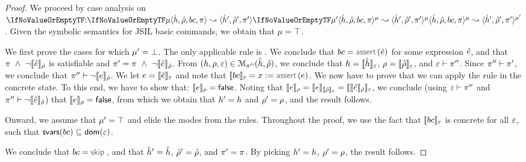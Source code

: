 \begin{proof}
We proceed by case analysis on $\symbtrans[][\mode][\mode']{\sheap, \sstore, \bcmd, \pc}{\sheap', \sstore', \pc'}$. 
Given the symbolic semantics for JSIL basic commands, we obtain that $\mode = \top$. 

\medskip
We first prove the cases for which $\mode' = \bot$. The only applicable rule is .
We conclude that  $\bcmd = \assert(\sexpr)$ for some expression $\sexpr$, and that
$\pc \ \wedge \  \neg\symbeval{\sexpr}{\sstore}$ is satisfiable and $\pc' = \pc \ \wedge \  \neg\symbeval{\sexpr}{\sstore}$. 
From $(\heap, \store, \senv) \in \smodels{\sheap, \sstore}{\pc''}$, we conclude that $\heap = \semexpr{\sheap}{\senv}$, $\store = \semexpr{\sstore}{\senv}$, and 
$\senv \vdash \pc''$. Since $\pc'' \vdash \pc'$,
we conclude that $\pc'' \vdash \neg\symbeval{\jsilexpr}{\sstore}$.
We let $\jsilexpr = \symbeval{\sexpr}{\senv}$ and note that $\symbeval{\bcmd}{\senv} = \jvar := \assert(\jsilexpr)$.
We now have to prove that we can apply the  rule in the concrete state.
To this end, we have to show that: $\symbeval{\jsilexpr}{\store} = \jfalse$. 
Noting that
$
  \symbeval{\jsilexpr}{\store} = \symbeval{\jsilexpr}{\symbeval{\sstore}{\senv}} 
         = \symbeval{\symbeval{\sexpr}{\sstore}}{\senv} 
$, we conclude (using $\senv \vdash \pc''$ and $\pc'' \vdash  \neg\symbeval{\sexpr}{\sstore}$) that 
$\symbeval{\jsilexpr}{\store} = \jfalse$, from which we obtain that $\heap' = \heap$ and $\store' = \store$, and the result follows. 

\medskip
Onward, we assume that $\mode' = \top$ and elide the modes from the rules.
Throughout the proof, we use the fact that $\symbeval{\bcmd}{\senv}$ is concrete for all $\senv$, such that $\svarsreallyqueen(\bcmd) \subseteq \domain(\senv)$.
\vspace{5pt}

\noindent{} 
We conclude that $\bcmd = \jsilskip$, and 
that $\sheap' = \sheap$, $\sstore' = \sstore$, and $\pc' = \pc$. 
By picking $\heap' = \heap$, $\store' = \store$, the result follows. 
\vspace{6pt}


\end{proof}
